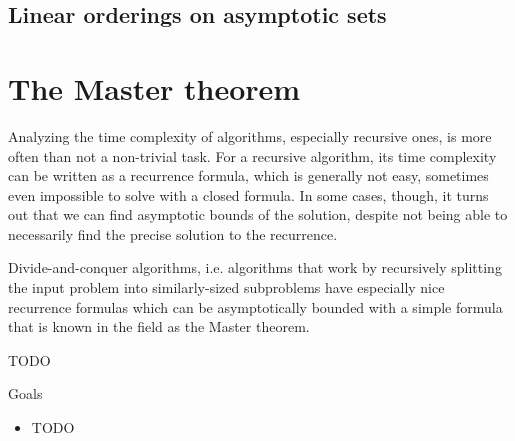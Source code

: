 \subsection{Linear orderings on asymptotic sets}

\section{The Master theorem}

Analyzing the time complexity of algorithms, especially recursive ones, is more often than not 
a non-trivial task. For a recursive algorithm, its time complexity can be written as a recurrence
formula, which is generally not easy, sometimes even impossible to solve with a closed formula.
In some cases, though, it turns out that we can find asymptotic bounds of the solution, despite not
being able to necessarily find the precise solution to the recurrence.

Divide-and-conquer algorithms, i.e. algorithms that work by recursively splitting the input problem
into similarly-sized subproblems have especially nice recurrence formulas which can be asymptotically
bounded with a simple formula that is known in the field as the Master theorem.

\begin{theorem}
TODO
\end{theorem}

Goals
\begin{itemize}
\item TODO
\end{itemize}
